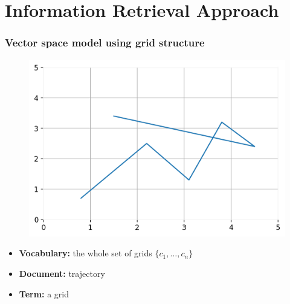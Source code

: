 \documentclass{beamer}
\begin{document}
\section{Information Retrieval Approach}


\begin{frame}
\frametitle{Vector space model using grid structure}  \vspace{-9mm}
\begin{block}{} 
\begin{figure}[h] 
\includegraphics[width=0.6 \textwidth]{grid} 
\end{figure}  \vspace{-3mm} \pause

\begin{itemize}
\item {\bf Vocabulary:} the whole set of grids $\{c_1, \ldots, c_n\}$
\item {\bf Document:} trajectory
\item {\bf Term:} a grid
\end{itemize}
\end{block}
\end{frame}
\end{document}
